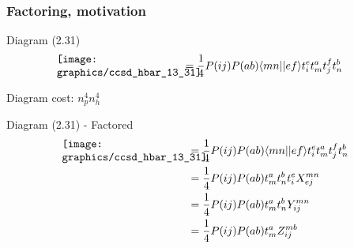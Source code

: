 \begin{frame}
    \frametitle{Factoring, motivation}

\scriptsize
\begin{block}{Diagram (2.31)}
    \begin{align*}
        \parbox{40mm}{\texttt{[image: graphics/ccsd\_hbar\_13\_31]}}
        &= \frac{1}{4} P(ij) P(ab) \bra{mn}\ket{ef} t_i^e t_m^a t_j^f t_n^b
    \end{align*}
\end{block}
Diagram cost: $n_p^4 n_h^4$
\begin{block}{Diagram (2.31) - Factored}
    \begin{align*}
        \parbox{40mm}{\texttt{[image: graphics/ccsd\_hbar\_13\_31]}}
        &= \frac{1}{4} P(ij) P(ab) \bra{mn}\ket{ef} t_i^e t_m^a t_j^f t_n^b \nn
        &= \frac{1}{4} P(ij) P(ab) t_m^a t_n^b t_i^e X_{ej}^{mn} \nn
        &= \frac{1}{4} P(ij) P(ab) t_m^a t_n^b Y_{ij}^{mn} \nn
        &= \frac{1}{4} P(ij) P(ab) t_m^a Z_{ij}^{mb}
    \end{align*}
\end{block}
\end{frame}
